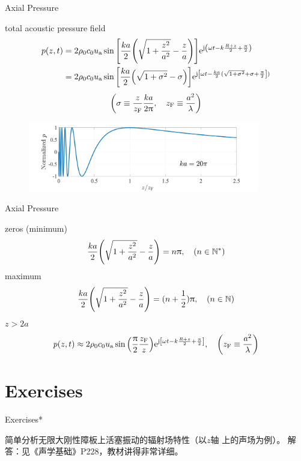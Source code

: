 \documentclass[9pt,mathserif]{beamer}
\let\emph\relax %
\begin{document}
\begin{frame}{Axial Pressure}
	\begin{outline}
		\1 total acoustic pressure field
		\begin{align*}
			p(z,t)
			&= 2\rho_0c_0 u_\text{a}
			\sin \qty[\frac{ka}{2}\qty(\sqrt{1+\frac{z^2}{a^2}}-\frac{z}{a})]
			\mathrm{e}^{\mathrm{j}\qty(\omega t - k \frac{R+z}{2} + \frac{\uppi}{2})}\\
			& = 2\rho_0 c_0 u_\text{a}\sin\qty[\frac{ka}{2}
			\qty(\sqrt{1+\sigma^2} - \sigma)]
			\mathrm{e}^{\mathrm{j}\qty[\omega t - \frac{ka}{2} (\sqrt{1+\sigma^2}+\sigma
			+\frac{\uppi}{2}])}
		\end{align*}
		$$\qty(\sigma \equiv \frac{z}{z\st{F}} \frac{ka}{2\uppi}\qc 
		z\st{F} \equiv \frac{a^2}{\lambda})$$
	\end{outline}
	\begin{figure}
		\centering
		\includegraphics[width =0.9\textwidth]{img/radi/PlotCircularPistonSourceAxialPressure.jpg}
	\end{figure}
\end{frame}

\begin{frame}{Axial Pressure}
	\begin{outline}
		\1 zeros (minimum)
		$$
		\frac{ka}{2} \qty(\sqrt{1+\frac{z^2}{a^2}}-\frac{z}{a})
		= n \uppi \qc (n \in \N^*)
		$$
		\1 maximum
		$$
		\frac{ka}{2} \qty(\sqrt{1+\frac{z^2}{a^2}}-\frac{z}{a})
		= (n+\frac12) \uppi \qc (n \in \N)
		$$
		\1 $ z>2a$
		$$p(z,t)\approx  2\rho_0c_0 u\st{a} \sin\qty(\frac{\uppi}{2} \frac{
			z\st{F}}{z}) \me^{\mj \qty[\omega t - k\frac{R+z}{2}+\frac{
			\uppi}{2}]}
			\qc \qty(z\st{F} \equiv \frac{a^2}{\lambda})
			$$
	\end{outline}
\end{frame}

\section{Exercises}
\begin{frame}{Exercises*}
	\begin{outline}
		\1 \emph{4.} 简单分析无限大刚性障板上活塞振动的辐射场特性（以$z$轴
	上的声场为例）。
		\1 解答：见《声学基础》P228，教材讲得非常详细。
	\end{outline}
\end{frame}
\end{document}

